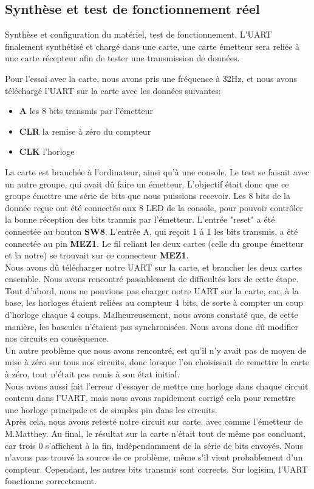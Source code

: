 \documentclass[a4paper]{article} %
\begin{document}
 \subsection{Synthèse et test de fonctionnement réel}
Synthèse et configuration du matériel, test de fonctionnement.
L’UART finalement synthétisé et chargé dans une carte, une carte émetteur sera reliée à une carte récepteur afin de tester une transmission de données.
\begin{tcolorbox}[colframe=Monokaimagenta,colback=white]
Pour l'essai avec la carte, nous avons pris une fréquence à 32Hz, et nous avons téléchargé l'UART sur la carte avec les données suivantes:
\begin{itemize}
    \item     \textbf{A} les 8 bits transmis par l'émetteur
    \item     \textbf{CLR} la remise à zéro du compteur
    \item     \textbf{CLK} l'horloge
\end{itemize}

La carte est branchée à l'ordinateur, ainsi qu'à une console. Le test se faisait avec un autre groupe, qui avait dû faire un émetteur. L'objectif était donc que ce groupe émettre une série de bits que nous puissions recevoir.
Les 8 bits de la donnée reçue ont été connectés aux 8 LED de la console, pour pouvoir contrôler la bonne réception des bits tranmis par l'émetteur. L'entrée "reset" a été connectée au bouton \textbf{SW8}. L'entrée A, qui reçoit 1 à 1 les bits transmis, a été connectée au pin \textbf{MEZ1}. Le fil reliant les deux cartes (celle du groupe émetteur et la notre) se trouvait sur ce connecteur \textbf{MEZ1}.\\
Nous avons dû télécharger notre UART sur la carte, et brancher les deux cartes ensemble.
Nous avons rencontré passablement de difficultés lors de cette étape. Tout d'abord, nous ne pouvions pas charger notre UART sur la carte, car, à la base, les horloges étaient reliées au compteur 4 bits, de sorte à compter un coup d'horloge chaque 4 coups. Malheureusement, nous avons constaté que, de cette manière, les bascules n'étaient pas synchronisées. Nous avons donc dû modifier nos circuits en conséquence.\\
Un autre problème que nous avons rencontré, est qu'il n'y avait pas de moyen de mise à zéro sur tous nos circuits, donc lorsque l'on choisissait de remettre la carte à zéro, tout n'était pas remis à son état initial.\\
Nous avons aussi fait l'erreur d'essayer de mettre une horloge dans chaque circuit contenu dans l'UART, mais nous avons rapidement corrigé cela pour remettre une horloge principale et de simples pin dans les circuits.\\
Après cela, nous avons retesté notre circuit sur carte, avec comme l'émetteur de M.Matthey. Au final, le résultat sur la carte n'était tout de même pas concluant, car trois $0$ s'affichent à la fin, indépendamment de la série de bits envoyés. Nous n'avons pas trouvé la source de ce problème, même s'il vient probablement d'un compteur. Cependant, les autres bits transmis sont corrects. Sur logisim, l'UART fonctionne correctement.

\end{tcolorbox}
\end{document}
